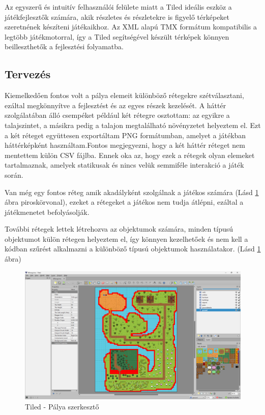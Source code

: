 Az egyszerű és intuitív felhasználói felülete miatt a Tiled ideális eszköz a játékfejlesztők számára, akik részletes és részletekre is figyelő térképeket szeretnének készíteni játékaikhoz. Az XML alapú TMX formátum kompatibilis a legtöbb játékmotorral, így a Tiled segítségével készült térképek könnyen beilleszthetők a fejlesztési folyamatba.


\subsection{Tervezés}

\indent \indent Kiemelkedően fontos volt a pálya elemeit különböző rétegekre szétválasztani, ezáltal megkönnyítve a fejlesztést és az egyes részek kezelését. A háttér szolgálatában álló csempéket például két rétegre osztottam: az egyikre a talajszintet, a másikra pedig a talajon megtalálható növényzetet helyeztem el. Ezt a két réteget együttesen exportáltam PNG formátumban, amelyet a játékban háttérképként használtam.Fontos megjegyezni, hogy a két háttér réteget nem mentettem külön CSV fájlba. Ennek oka az, hogy ezek a rétegek olyan elemeket tartalmaznak, amelyek statikusak és nincs velük semmiféle interakció a játék során. 

Van még egy fontos réteg amik akadályként szolgálnak a játékos számára (Lásd \ref{fig:Tiled} ábra piroskörvonal), ezeket a rétegeket a játékos nem tudja átlépni, ezáltal a játékmenetet befolyásolják.  

További rétegek lettek létrehozva az objektumok számára, minden típusú objektumot külön rétegen helyeztem el, így könnyen kezelhetőek és nem kell a kódban szűrést alkalmazni a különböző típusú objektumok használatakor. (Lásd \ref{fig:Tiled} ábra)

\begin{figure}[H]
    \centering
    \includegraphics[width=14.0truecm]{images/Tiled.png}
    \caption{Tiled - Pálya szerkesztő
    \cite{Tiled}}
    \label{fig:Tiled}
\end{figure}

